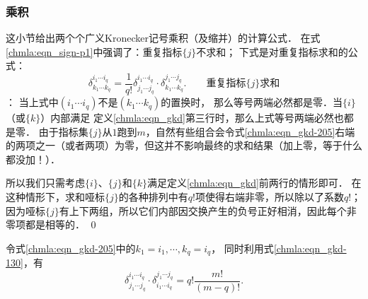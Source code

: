 \subsubsection{乘积}
这小节给出两个个广义Kronecker记号乘积（及缩并）的计算公式． 
在式\eqref{chmla:eqn_sign-p1}中强调了：{\kaishu 重复指标$\{j\}$不求和}；
下式是对重复指标求和的公式：
\begin{equation}\label{chmla:eqn_gkd-205}
    \delta_{k_1 \cdots k_q}^{i_1 \cdots i_q} =
      \frac{1}{q!}\delta_{j_1 \cdots j_q}^{i_1 \cdots i_q}
      \cdot \delta_{k_1 \cdots k_q}^{j_1 \cdots j_q} .
      \qquad \text{重复指标$\{j\}$求和}
\end{equation}
：
当上式中$(i_1 \cdots i_q)$不是$(k_1 \cdots k_q)$的置换时，
那么等号两端必然都是零．当$\{i\}$（或$\{k\}$）内部满足
定义\eqref{chmla:eqn_gkd}第三行时，那么上式等号两端必然也都是零．
由于指标集$\{j\}$从$1$跑到$m$，自然有些组合会令式\eqref{chmla:eqn_gkd-205}右端
的两项之一（或者两项）为零，但这并不影响最终的{\kaishu 求和}结果（加上零，等于什么都没加！）．

所以我们只需考虑$\{i\}$、$\{j\}$和$\{k\}$满足定义\eqref{chmla:eqn_gkd}前两行的情形即可．
在这种情形下，求和哑标$\{j\}$的各种排列中有$q!$项使得右端非零，所以除以了系数$q!$；
因为哑标$\{j\}$有上下两组，所以它们内部因交换产生的负号正好相消，因此每个非零项都是相等的．
\qed

令式\eqref{chmla:eqn_gkd-205}中的$k_{1}=i_{1},\cdots, k_q=i_q$，
同时利用式\eqref{chmla:eqn_gkd-130}，有
\begin{equation}\label{chmla:eqn_gkd-225}
    \delta_{j_1 \cdots j_q }^{i_1 \cdots i_q }
    \cdot \delta_{i_{1}\cdots i_q }^{j_1 \cdots j_q }
    =q! \frac{m!}{(m-q)!} .
\end{equation}

